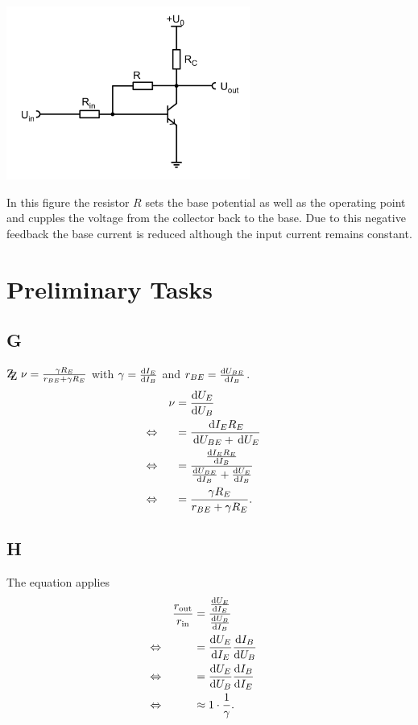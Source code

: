 \documentclass[a4paper,10pt]{article}
\newcommand{\td}{\,\text{d}}
\newcommand{\zz}{\mathrm{Z\kern-.3em\raise-0.5ex\hbox{Z} }}
\newenvironment{Figure}
  {\par\medskip\noindent\minipage{\linewidth}}
  {\endminipage\par\medskip} %
\numberwithin{equation}{section}
\begin{document}
\begin{multicols}{2}
	\begin{Figure}
		\centering
		\includegraphics[width=0.6\textwidth]{spannungsgegenkopplung.png}
	\end{Figure}
	In this figure the resistor $R$ sets the base potential as well as the operating point and cupples the voltage from the collector back to the base.
	Due to this negative feedback the base current is reduced although the input current remains constant.

	\newpage
	\section{Preliminary Tasks}
	\subsection{G}
	$\zz\ \nu =\tfrac{\gamma R_E}{r_{BE}+\gamma R_E}$ with $\gamma =\diff[]{I_E}{I_B}$ and $r_{BE}=\diff[]{U_{BE}}{I_B}$.
	\begin{align}
		                &  & \nu & = \diff[]{U_E}{U_B}                                                    &  &           \\
		\Leftrightarrow &  &     & = \dfrac{\td I_ER_E}{\td U_{BE}+\td U_E}                               &  & \nonumber \\
		\Leftrightarrow &  &     & = \dfrac{\diff[]{I_ER_E}{I_B}}{\diff[]{U_{BE}}{I_B}+\diff[]{U_E}{I_B}} &  & \nonumber \\
		\Leftrightarrow &  &     & = \dfrac{\gamma R_E}{r_{BE}+\gamma R_E}.                               &  &
	\end{align}

	\subsection{H}
	The equation applies
	\begin{align}
		                &  & \dfrac{r_\text{out}}{r_\text{in}} & = \dfrac{\diff[]{U_E}{I_E}}{\diff[]{U_B}{I_B}} &  &           \\
		\Leftrightarrow &  &                                   & = \diff[]{U_E}{I_E}\diff[]{I_B}{U_B}           &  & \nonumber \\
		\Leftrightarrow &  &                                   & = \diff[]{U_E}{U_B}\diff[]{I_B}{I_E}           &  & \nonumber \\
		\Leftrightarrow &  &                                   & \approx 1\cdot \dfrac{1}{\gamma }.             &  &
	\end{align}


\end{multicols}
\end{document}
